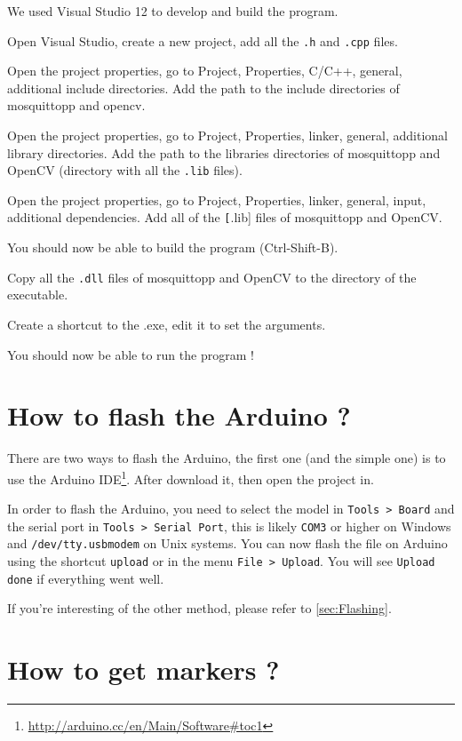 \documentclass[a4paper,11pt]{report}
\begin{document}
We used Visual Studio 12 to develop and build the program.

Open Visual Studio, create a new project, add all the \texttt{.h} and
\texttt{.cpp} files.

Open the project properties, go to Project, Properties, C/C++, general,
additional include directories. Add the path to the include directories of
mosquittopp and opencv.

Open the project properties, go to Project, Properties, linker, general,
additional library directories. Add the path to the libraries directories of
mosquittopp and OpenCV (directory with all the \texttt{.lib} files).

Open the project properties, go to Project, Properties, linker, general, input,
additional dependencies. Add all of the \texttt[.lib] files of mosquittopp and
OpenCV.

You should now be able to build the program (Ctrl-Shift-B).

Copy all the \texttt{.dll} files of mosquittopp and OpenCV to the directory of
the executable.

Create a shortcut to the .exe, edit it to set the arguments.

You should now be able to run the program !




\section{How to flash the Arduino ?}

There are two ways to flash the Arduino, the first one (and the simple one) is
to use the Arduino IDE\footnote{\url{http://arduino.cc/en/Main/Software\#toc1}}. After
download it, then open the project in.

In order to flash the Arduino, you need to select the model in \texttt{Tools >
Board} and the serial port in \texttt{Tools > Serial Port}, this is likely
\texttt{COM3} or higher on Windows and \texttt{/dev/tty.usbmodem} on Unix systems.
You can now flash the file on Arduino using the shortcut \texttt{upload} or in
the menu \texttt{File > Upload}. You will see \texttt{Upload done} if everything
went well.

If you're interesting of the other method, please refer to \ref{sec:Flashing}.

\section{How to get markers ?}
\end{document}

